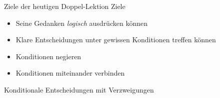 \begin{frame}[fragile]{Ziele der heutigen Doppel-Lektion}
    Ziele
    \begin{itemize}[<+->]
        \item Seine Gedanken \textit{logisch} ausdrücken können
        \item Klare Entscheidungen unter gewissen Konditionen treffen können
        \item Konditionen negieren
        \item Konditionen miteinander verbinden
    \end{itemize}
\end{frame}

\begin{frame}[fragile]{Konditionale Entscheidungen mit Verzweigungen}
    

\end{frame}

